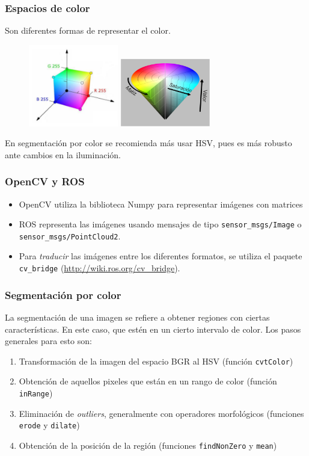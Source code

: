 \documentclass[10pt,spanish,aspectratio=1610]{beamer}
\begin{document}
\begin{frame}\frametitle{Espacios de color}
  Son diferentes formas de representar el color.
  \begin{figure}
    \centering
    \includegraphics[width=0.35\textwidth]{Figures/RGB_model.pdf}
    \includegraphics[width=0.35\textwidth]{Figures/hsv_space.pdf}
  \end{figure}
  En segmentación por color se recomienda más usar HSV, pues es más robusto ante cambios en la iluminación.
\end{frame}

\begin{frame}\frametitle{OpenCV y ROS}
  \begin{itemize}
  \item OpenCV utiliza la biblioteca Numpy para representar imágenes con matrices
  \item ROS representa las imágenes usando mensajes de tipo \texttt{sensor\_msgs/Image} o \texttt{sensor\_msgs/PointCloud2}.
  \item Para \textit{traducir} las imágenes entre los diferentes formatos, se utiliza el paquete \texttt{cv\_bridge} (\url{http://wiki.ros.org/cv_bridge}).
  \end{itemize}
\end{frame}

\begin{frame}\frametitle{Segmentación por color}
  La segmentación de una imagen se refiere a obtener regiones con ciertas características. En este caso, que estén en un cierto intervalo de color. Los pasos generales para esto son:
  \begin{enumerate}
  \item Transformación de la imagen del espacio BGR al HSV (función \texttt{cvtColor})
  \item Obtención de aquellos pixeles que están en un rango de color (función \texttt{inRange})
  \item Eliminación de \textit{outliers}, generalmente con operadores morfológicos (funciones \texttt{erode} y \texttt{dilate})
  \item Obtención de la posición de la región (funciones \texttt{findNonZero} y \texttt{mean})
  \end{enumerate}
\end{frame}
\end{document}
